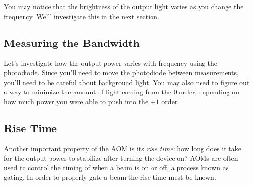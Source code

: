 \documentclass[]{manual}
\begin{document}
    You may notice that the brightness of the output light varies as you change the frequency.
    We'll investigate this in the next section.


    \subsection{Measuring the Bandwidth}

    Let's investigate how the output power varies with frequency using the photodiode.
    Since you'll need to move the photodiode between measurements, you'll need to be careful about background light.
    You may also need to figure out a way to minimize the amount of light coming from the $0$ order, depending on how much power you were able to push into the $+1$ order.


    \subsection{Rise Time}

    Another important property of the AOM is its \emph{rise time}:
    how long does it take for the output power to stabilize after turning the device on?
    AOMs are often used to control the timing of when a beam is on or off, a process known as gating.  In order to properly gate a beam the rise time must be known.
\end{document}
